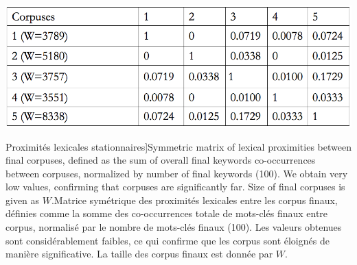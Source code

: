 \begin{table}
\centering
\includegraphics[width=\textwidth]{Figures/QuantitativeEpistemo/corpusesDistances}
\caption[Stationary lexical proximities][Proximités lexicales stationnaires]{Symmetric matrix of lexical proximities between final corpuses, defined as the sum of overall final keywords co-occurrences between corpuses, normalized by number of final keywords (100). We obtain very low values, confirming that corpuses are significantly far. Size of final corpuses is given as $W$.}{Matrice symétrique des proximités lexicales entre les corpus finaux, définies comme la somme des co-occurrences totale de mots-clés finaux entre corpus, normalisé par le nombre de mots-clés finaux (100). Les valeurs obtenues sont considérablement faibles, ce qui confirme que les corpus sont éloignés de manière significative. La taille des corpus finaux est donnée par $W$. }
\label{tab:quantepistemo:lexical}
\end{table}







